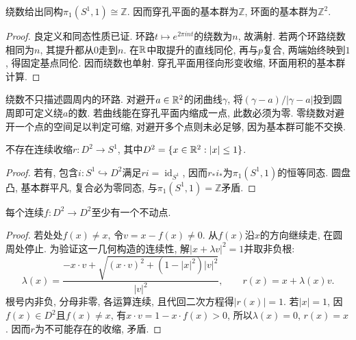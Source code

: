 \begin{theorem}\label{thm:pi1-circle}
绕数给出同构$\pi_1(S^1,1)\cong\mathbb Z$. 因而穿孔平面的基本群为$\mathbb Z$, 环面的基本群为$\mathbb Z^2$.
\end{theorem}
\begin{proof}
良定义和同态性质已证. 环路$t\mapsto e^{2\pi int}$的绕数为$n$, 故满射. 若两个环路绕数相同为$n$, 其提升都从$0$走到$n$. 在$\mathbb R$中取提升的直线同伦, 再与$p$复合, 两端始终映到$1$, 得固定基点同伦. 因而绕数也单射. 穿孔平面用径向形变收缩, 环面用积的基本群计算.
\end{proof}
绕数不只描述圆周内的环路. 对避开$a\in\mathbb R^2$的闭曲线$\gamma$, 将$(\gamma-a)/|\gamma-a|$投到圆周即可定义绕$a$的数. 若曲线能在穿孔平面内缩成一点, 此数必须为零. 零绕数对避开一个点的空间足以判定可缩, 对避开多个点则未必足够, 因为基本群可能不交换.

\begin{theorem}\label{thm:no-retract-disk}
不存在连续收缩$r:D^2\to S^1$, 其中$D^2=\{x\in\mathbb R^2:|x|\le1\}$.
\end{theorem}
\begin{proof}
若有, 包含$i:S^1\hookrightarrow D^2$满足$ri=\operatorname{id}_{S^1}$, 因而$r_*i_*$为$\pi_1(S^1,1)$的恒等同态. 圆盘凸, 基本群平凡, 复合必为零同态, 与$\pi_1(S^1,1)=\mathbb Z$矛盾.
\end{proof}

\begin{theorem}[二维Brouwer不动点定理]
每个连续$f:D^2\to D^2$至少有一个不动点.
\end{theorem}
\begin{proof}
若处处$f(x)\ne x$, 令$v=x-f(x)\ne0$. 从$f(x)$沿$x$的方向继续走, 在圆周处停止. 为验证这一几何构造的连续性, 解$|x+\lambda v|^2=1$并取非负根:
\[
 \lambda(x)=\frac{-x\cdot v+\sqrt{(x\cdot v)^2+(1-|x|^2)|v|^2}}{|v|^2},
 \qquad r(x)=x+\lambda(x)v.
\]
根号内非负, 分母非零, 各运算连续, 且代回二次方程得$|r(x)|=1$. 若$|x|=1$, 因$f(x)\in D^2$且$f(x)\ne x$, 有$x\cdot v=1-x\cdot f(x)>0$, 所以$\lambda(x)=0$, $r(x)=x$. 因而$r$为不可能存在的收缩, 矛盾.
\end{proof}

